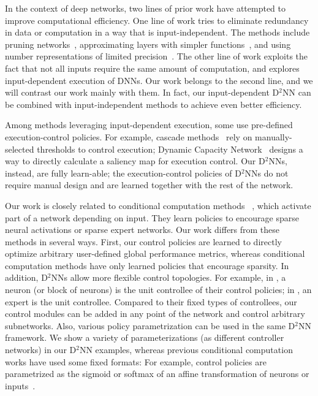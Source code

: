 \documentclass[10pt,twocolumn,letterpaper]{article}
\begin{document}
In the context of deep networks, two lines of prior work have attempted to improve
computational efficiency. 
 One line of work tries to eliminate redundancy in data or computation in a
way that is input-independent.
The methods include pruning networks~\cite{han2015learning,wen2016learning,alvarez2016learning}, approximating layers with simpler
functions~\cite{denton2014exploiting,zhang2016accelerating}, and using number representations of limited
precision~\cite{chen2014dadiannao,gupta2015deep}. 
The other line of work exploits the fact that not all inputs require the same amount of
computation, and explores input-dependent execution of DNNs. Our work belongs to the
second line, and we will contrast our work mainly with them. In fact, our input-dependent D$^2$NN can be combined with input-independent methods to achieve even better efficiency. 

Among methods leveraging input-dependent execution, some use pre-defined execution-control
policies. For example,  cascade methods~\cite{li2015convolutional,sun2013deep}
rely on manually-selected thresholds to control execution; Dynamic Capacity
Network~\cite{DBLP:conf/icml/AlmahairiBCZLC16} designs a way to
directly calculate a saliency map for execution control. Our D$^2$NNs, instead, are fully
learn-able; the execution-control policies of D$^2$NNs do not require manual design and
are learned together with the rest of the network. 

Our work is closely related to conditional computation methods
~\cite{bengio2015conditional,bengio2013estimating,shazeer2017outrageously}, which activate part of a network
depending on input. 
They learn
policies to encourage sparse neural activations\cite{bengio2015conditional} or sparse expert networks\cite{shazeer2017outrageously}.
Our work differs from these methods in several ways. First, our
control policies are learned to directly optimize arbitrary user-defined global performance
metrics,
 whereas conditional computation methods have only learned policies that
encourage sparsity. 
In addition,
D$^2$NNs allow more flexible control topologies. 
For example, in \cite{bengio2015conditional}, a neuron (or block of neurons) is the unit controllee of their control policies; in \cite{shazeer2017outrageously}, an expert is the unit controllee. Compared to their fixed types of controllees, our control modules can be added in any point of the network and control arbitrary subnetworks. 
Also, various policy parametrization can be used in the same D$^2$NN framework.
We show a variety of parameterizations (as different controller networks) in our D$^2$NN examples, whereas previous conditional computation works have used some fixed formats: For example, control policies are parametrized as the sigmoid or softmax of an affine
transformation of neurons or inputs~\cite{bengio2015conditional,shazeer2017outrageously}. 
\end{document}
